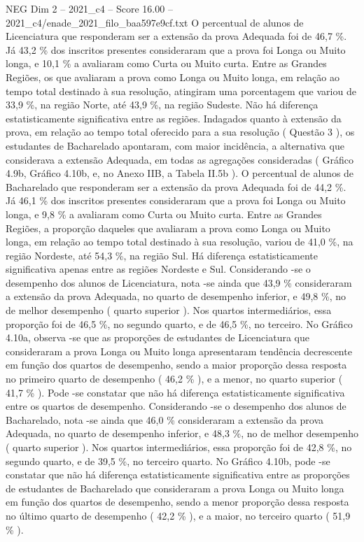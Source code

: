 \begin{textsample}{NEG Dim 2 – 2021\_c4 – Score 16.00 – 2021\_c4/enade\_2021\_filo\_baa597e9cf.txt}
O percentual de alunos de Licenciatura que responderam ser a extensão da prova Adequada foi de 46,7 \%.
Já 43,2 \% dos inscritos presentes consideraram que a prova foi Longa ou Muito longa, e 10,1 \% a avaliaram como Curta ou Muito curta.
Entre as Grandes Regiões, os que avaliaram a prova como Longa ou Muito longa, em relação ao tempo total destinado à sua resolução, atingiram uma porcentagem que variou de 33,9 \%, na região Norte, até 43,9 \%, na região Sudeste.
Não há diferença estatisticamente significativa entre as regiões.
Indagados quanto à extensão da prova, em relação ao tempo total oferecido para a sua resolução ( Questão 3 ), os estudantes de Bacharelado apontaram, com maior incidência, a alternativa que considerava a extensão Adequada, em todas as agregações consideradas ( Gráfico 4.9b, Gráfico 4.10b, e, no Anexo IIB, a Tabela II.5b ).
O percentual de alunos de Bacharelado que responderam ser a extensão da prova Adequada foi de 44,2 \%.
Já 46,1 \% dos inscritos presentes consideraram que a prova foi Longa ou Muito longa, e 9,8 \% a avaliaram como Curta ou Muito curta.
Entre as Grandes Regiões, a proporção daqueles que avaliaram a prova como Longa ou Muito longa, em relação ao tempo total destinado à sua resolução, variou de 41,0 \%, na região Nordeste, até 54,3 \%, na região Sul.
Há diferença estatisticamente significativa apenas entre as regiões Nordeste e Sul.
Considerando -se o desempenho dos alunos de Licenciatura, nota -se ainda que 43,9 \% consideraram a extensão da prova Adequada, no quarto de desempenho inferior, e 49,8 \%, no de melhor desempenho ( quarto superior ).
Nos quartos intermediários, essa proporção foi de 46,5 \%, no segundo quarto, e de 46,5 \%, no terceiro.
No Gráfico 4.10a, observa -se que as proporções de estudantes de Licenciatura que consideraram a prova Longa ou Muito longa apresentaram tendência decrescente em função dos quartos de desempenho, sendo a maior proporção dessa resposta no primeiro quarto de desempenho ( 46,2 \% ), e a menor, no quarto superior ( 41,7 \% ).
Pode -se constatar que não há diferença estatisticamente significativa entre os quartos de desempenho.
Considerando -se o desempenho dos alunos de Bacharelado, nota -se ainda que 46,0 \% consideraram a extensão da prova Adequada, no quarto de desempenho inferior, e 48,3 \%, no de melhor desempenho ( quarto superior ).
Nos quartos intermediários, essa proporção foi de 42,8 \%, no segundo quarto, e de 39,5 \%, no terceiro quarto.
No Gráfico 4.10b, pode -se constatar que não há diferença estatisticamente significativa entre as proporções de estudantes de Bacharelado que consideraram a prova Longa ou Muito longa em função dos quartos de desempenho, sendo a menor proporção dessa resposta no último quarto de desempenho ( 42,2 \% ), e a maior, no terceiro quarto ( 51,9 \% ).

\end{textsample}
